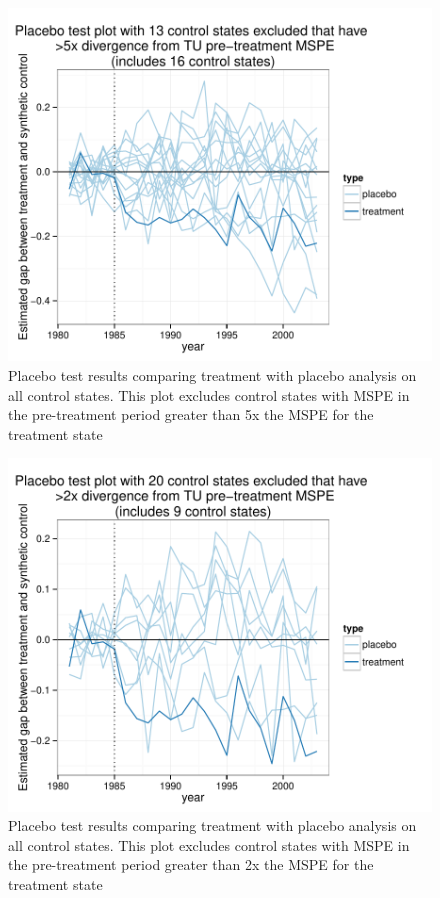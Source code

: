 \begin{figure}[htbp]
\begin{center}
\includegraphics{img-placeboTest5.pdf}
\caption{Placebo test results comparing treatment with placebo analysis on all control states.  This plot excludes control states with MSPE in the pre-treatment period greater than 5x the MSPE for the treatment state}
\label{fig:ps5}
\end{center}
\end{figure}

\begin{figure}[htbp]
\begin{center}
\includegraphics{img-placeboTest2.pdf}
\caption{Placebo test results comparing treatment with placebo analysis on all control states.  This plot excludes control states with MSPE in the pre-treatment period greater than 2x the MSPE for the treatment state}
\label{fig:ps2}
\end{center}
\end{figure}